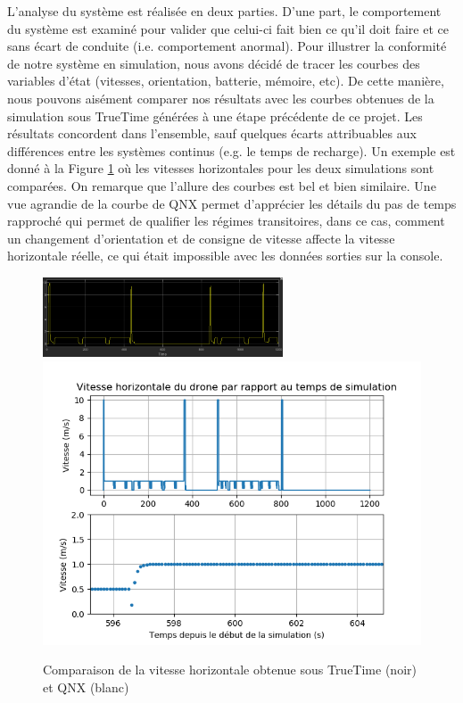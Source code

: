\documentclass[journal]{IEEEtran}
\begin{document}
L'analyse du système est réalisée en deux parties. D'une part, le comportement du système est examiné pour valider que celui-ci fait bien ce qu'il doit faire et ce sans écart de conduite (i.e. comportement anormal). Pour illustrer la conformité de notre système en simulation, nous avons décidé de tracer les courbes des variables d'état (vitesses, orientation, batterie, mémoire, etc). De cette manière, nous pouvons aisément comparer nos résultats avec les courbes obtenues de la simulation sous TrueTime générées à une étape précédente de ce projet. Les résultats concordent dans l'ensemble, sauf quelques écarts attribuables aux différences entre les systèmes continus (e.g. le temps de recharge). Un exemple est donné à la Figure \ref{fig:comparaisonVh} où les vitesses horizontales pour les deux simulations sont comparées. On remarque que l'allure des courbes est bel et bien similaire. Une vue agrandie de la courbe de QNX permet d'apprécier les détails du pas de temps rapproché qui permet de qualifier les régimes transitoires, dans ce cas, comment un changement d'orientation et de consigne de vitesse affecte la vitesse horizontale réelle, ce qui était impossible avec les données sorties sur la console.

\begin{figure}
	\centering
	\captionsetup{justification=centering}
	\includegraphics[width=2.8in]{TrueTimeVh.png}
	\includegraphics[width=\linewidth]{csv_variable_etat.png}
	\caption{Comparaison de la vitesse horizontale obtenue sous TrueTime (noir) et QNX (blanc)}
	\label{fig:comparaisonVh}
\end{figure}
\end{document}
